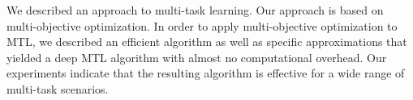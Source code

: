 
We described an approach to multi-task learning. Our approach is based on multi-objective optimization. In order to apply multi-objective optimization to MTL, we described an efficient algorithm as well as specific approximations that yielded a deep MTL algorithm with almost no computational overhead. Our experiments indicate that the resulting algorithm is effective for a wide range of multi-task scenarios.
